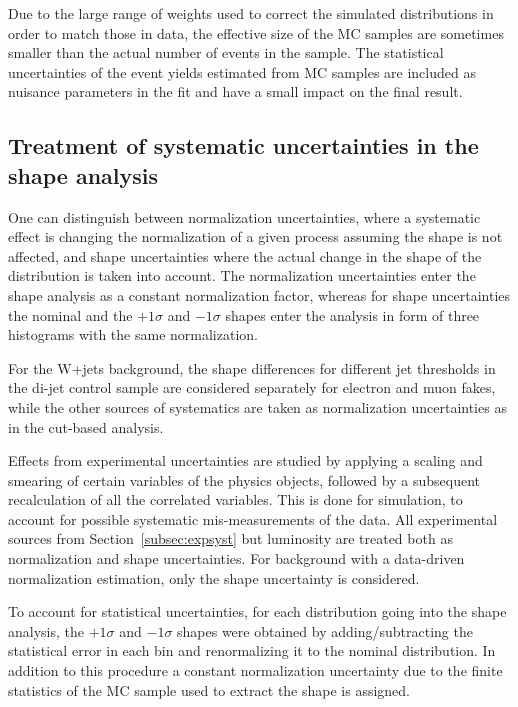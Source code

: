 Due to the large range of weights used to correct the simulated distributions in order to
match those in data, the effective size of the MC samples are sometimes smaller than
the actual number of events in the sample.
The statistical uncertainties of the event yields estimated from MC samples
are included as nuisance parameters in the fit and have a small impact on the final result.

\subsection{Treatment of systematic uncertainties in the shape analysis}\label{sec:syst_treatment}

One can distinguish between normalization uncertainties, where a systematic
effect is changing the normalization of a given process assuming the shape is not affected, and
shape uncertainties where the actual change in the shape of the distribution is
taken into account. The normalization uncertainties enter the shape analysis as
a constant normalization factor, whereas for shape uncertainties the nominal and
the $+1\sigma$ and $-1\sigma$ shapes enter the analysis in form of three histograms
with the same normalization. 

For the W+jets background, the shape differences for different jet \pt thresholds in the 
di-jet control sample are considered separately for electron and muon fakes, while the
other sources of systematics are taken as normalization uncertainties as in the cut-based
analysis.

Effects from experimental uncertainties are studied by applying a scaling and smearing of certain variables of the physics objects, followed by a subsequent
recalculation of all the correlated variables. This is done for simulation, to account for possible systematic mis-measurements of the data.
All experimental sources from Section~\ref{subsec:expsyst} but luminosity
are treated both as normalization and shape uncertainties.
For background with a data-driven normalization estimation,
only the shape uncertainty is considered.

To account for statistical uncertainties, for each distribution going into the shape analysis, 
the $+1\sigma$ and $-1\sigma$ shapes were obtained by adding/subtracting the statistical error 
in each bin and renormalizing it to the nominal distribution. In addition to this procedure a constant 
normalization uncertainty due to the finite statistics of the MC sample used to extract the shape is assigned.

